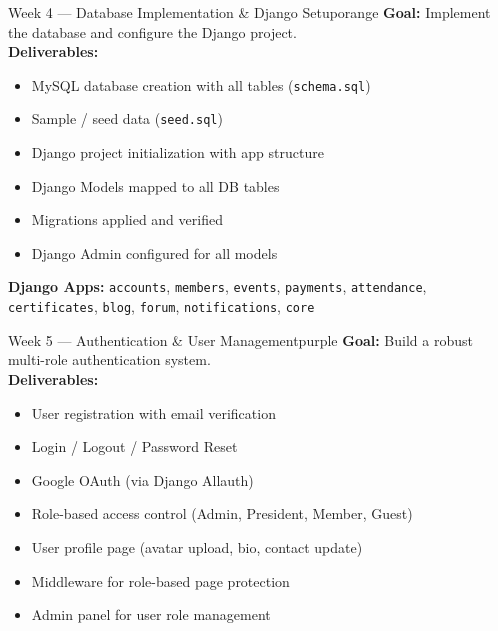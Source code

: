 \documentclass[12pt,a4paper]{article}
\begin{document}
\vspace{8pt}

\begin{weekbox}{Week 4 --- Database Implementation \& Django Setup}{orange}
\textbf{Goal:} Implement the database and configure the Django project.\\[6pt]
\textbf{Deliverables:}
\begin{itemize}[leftmargin=*, itemsep=2pt]
  \item MySQL database creation with all tables (\texttt{schema.sql})
  \item Sample / seed data (\texttt{seed.sql})
  \item Django project initialization with app structure
  \item Django Models mapped to all DB tables
  \item Migrations applied and verified
  \item Django Admin configured for all models
\end{itemize}
\textbf{Django Apps:} \texttt{accounts}, \texttt{members}, \texttt{events}, \texttt{payments}, \texttt{attendance}, \texttt{certificates}, \texttt{blog}, \texttt{forum}, \texttt{notifications}, \texttt{core}
\end{weekbox}

\vspace{8pt}

\begin{weekbox}{Week 5 --- Authentication \& User Management}{purple}
\textbf{Goal:} Build a robust multi-role authentication system.\\[6pt]
\textbf{Deliverables:}
\begin{itemize}[leftmargin=*, itemsep=2pt]
  \item User registration with email verification
  \item Login / Logout / Password Reset
  \item Google OAuth (via Django Allauth)
  \item Role-based access control (Admin, President, Member, Guest)
  \item User profile page (avatar upload, bio, contact update)
  \item Middleware for role-based page protection
  \item Admin panel for user role management
\end{itemize}
\end{weekbox}

\vspace{8pt}
\end{document}
